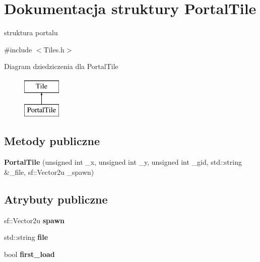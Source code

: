 \hypertarget{struct_portal_tile}{\section{Dokumentacja struktury Portal\-Tile}
\label{struct_portal_tile}
}


struktura portalu  




{\ttfamily \#include $<$Tiles.\-h$>$}

Diagram dziedziczenia dla Portal\-Tile\begin{figure}[H]
\begin{center}
\leavevmode
\includegraphics[height=2.000000cm]{struct_portal_tile}
\end{center}
\end{figure}
\subsection*{Metody publiczne}
\begin{DoxyCompactItemize}
\item 
\hypertarget{struct_portal_tile_a9ae99fce73ef382ee6f2e3aa6b3d4388}{{\bfseries Portal\-Tile} (unsigned int \-\_\-x, unsigned int \-\_\-y, unsigned int \-\_\-gid, std\-::string \&\-\_\-file, sf\-::\-Vector2u \-\_\-spawn)}\label{struct_portal_tile_a9ae99fce73ef382ee6f2e3aa6b3d4388}

\end{DoxyCompactItemize}
\subsection*{Atrybuty publiczne}
\begin{DoxyCompactItemize}
\item 
\hypertarget{struct_portal_tile_a0f3d60a453b8b9ec2d9cb14d382451d4}{sf\-::\-Vector2u {\bfseries spawn}}\label{struct_portal_tile_a0f3d60a453b8b9ec2d9cb14d382451d4}

\item 
\hypertarget{struct_portal_tile_aff05b35e46346897a6863877cfeac433}{std\-::string {\bfseries file}}\label{struct_portal_tile_aff05b35e46346897a6863877cfeac433}

\item 
\hypertarget{struct_portal_tile_a1e31f638d7b27e73164b14d3a0650d32}{bool {\bfseries first\-\_\-load}}\label{struct_portal_tile_a1e31f638d7b27e73164b14d3a0650d32}

\end{DoxyCompactItemize}


